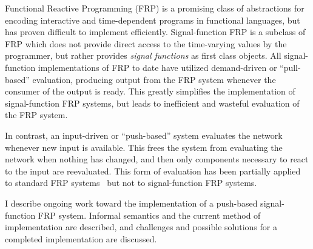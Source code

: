 Functional Reactive Programming (FRP) is a promising class of abstractions for encoding interactive and time-dependent programs in
functional languages, but has proven difficult to implement efficiently. Signal-function FRP is a subclass of FRP which does not provide
direct access to the time-varying  values by the programmer, but rather provides {\em signal functions} as first class objects.
All signal-function implementations of FRP to date have utilized demand-driven or ``pull-based''  evaluation, producing output from
the FRP system whenever the consumer of the output is ready. This greatly simplifies the implementation of signal-function FRP systems, but
leads to inefficient and wasteful evaluation of the FRP system.

In contrast, an input-driven or ``push-based'' system evaluates the network whenever new input is available. This frees the system from
evaluating the network when nothing has changed, and then only components necessary to react to the input are reevaluated.
This form of evaluation has been partially applied to standard FRP systems~\cite{Elliott2009} but not to signal-function FRP systems.

I describe ongoing work toward the implementation of a push-based signal-function FRP system. Informal semantics
and the current method of implementation are described, and challenges and possible solutions for a completed implementation
are discussed.
